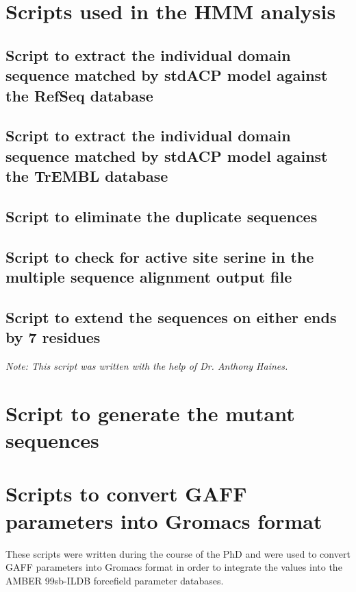 \begin{singlespacing}
\section{Scripts used in the HMM analysis}
\label{sec:HMMScripts}
	\subsection{Script to extract the individual domain sequence matched by stdACP model against the RefSeq database}
	\label{sec: RefSeqExtract}
	

	\subsection{Script to extract the individual domain sequence matched by stdACP model against the TrEMBL database}
	\label{sec: TrEMBLExtract}
	

	\subsection{Script to eliminate the duplicate sequences}
	\label{sec: FilterDuplicate}
	

	\subsection{Script to check for active site serine in the multiple sequence alignment output file}
	\label{sec: CheckS}
	

	\subsection{Script to extend the sequences on either ends by 7 residues} 
	\textit{Note: This script was written with the help of Dr. Anthony Haines.}
	\label{sec: Extend}
	

\section{Script to generate the mutant sequences}
\label{sec:MinChangesScript}


\section{Scripts to convert GAFF parameters into Gromacs format}
\label{sec:gafftogro}
These scripts were written during the course of the PhD and were used to convert GAFF parameters into Gromacs format in order to integrate the values into the AMBER 99sb-ILDB forcefield parameter databases. 


\end{singlespacing}
